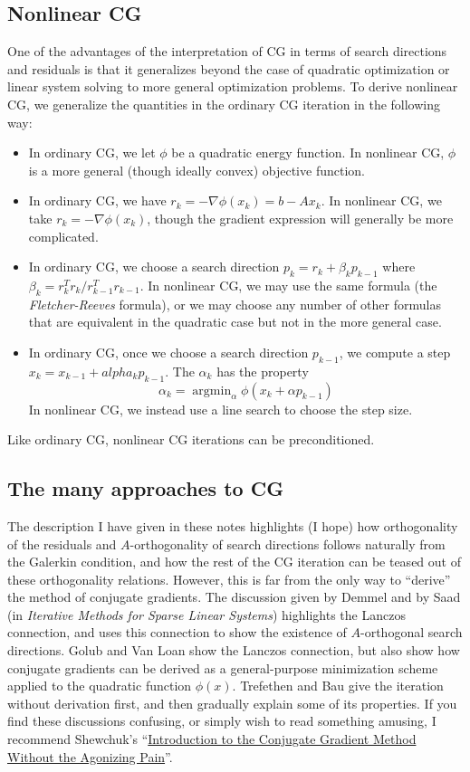 \subsection{Nonlinear CG}

One of the advantages of the interpretation of CG in terms of search
directions and residuals is that it generalizes beyond the case of
quadratic optimization or linear system solving to more general
optimization problems.  To derive nonlinear CG, we generalize the
quantities in the ordinary CG iteration in the following way:
\begin{itemize}
\item
  In ordinary CG, we let $\phi$ be a quadratic energy function.
  In nonlinear CG, $\phi$ is a more general (though ideally
  convex) objective function.
\item
  In ordinary CG, we have $r_k = -\nabla \phi(x_k) = b-Ax_k$.
  In nonlinear CG, we take $r_k = -\nabla \phi(x_k)$, though the
  gradient expression will generally be more complicated.
\item
  In ordinary CG, we choose a search direction $p_k = r_k + \beta_k p_{k-1}$
  where $\beta_k = r_k^T r_k / r_{k-1}^T r_{k-1}$.  In nonlinear CG,
  we may use the same formula (the {\em Fletcher-Reeves} formula),
  or we may choose any number of other formulas that are equivalent
  in the quadratic case but not in the more general case.
\item
  In ordinary CG, once we choose a search direction $p_{k-1}$, we compute
  a step $x_k = x_{k-1} + alpha_{k} p_{k-1}$.  The $\alpha_k$ has
  the property
  \[
    \alpha_k = \operatorname{argmin}_{\alpha} \phi(x_k + \alpha p_{k-1})
  \]
  In nonlinear CG, we instead use a line search to choose the step size.
\end{itemize}
Like ordinary CG, nonlinear CG iterations can be preconditioned.

\subsection{The many approaches to CG}

The description I have given in these notes highlights (I hope)
how orthogonality of the residuals and $A$-orthogonality
of search directions follows naturally from the Galerkin condition,
and how the rest of the CG iteration can be teased out of these
orthogonality relations.  However, this is far from the only way
to ``derive'' the method of conjugate gradients.  The discussion
given by Demmel and by Saad
(in {\em Iterative Methods for Sparse Linear Systems})
highlights the Lanczos connection, and uses this connection to
show the existence of $A$-orthogonal search directions.
Golub and Van Loan show the Lanczos connection, but also show
how conjugate gradients can be derived as a general-purpose minimization
scheme applied to the quadratic function $\phi(x)$.  Trefethen and Bau
give the iteration without derivation first, and then gradually explain
some of its properties.  If you find these discussions confusing,
or simply wish to read something amusing, I recommend Shewchuk's
``\href{http://www.cs.cmu.edu/~quake-papers/painless-conjugate-gradient.pdf}{Introduction to the Conjugate Gradient Method Without the Agonizing Pain}''.
